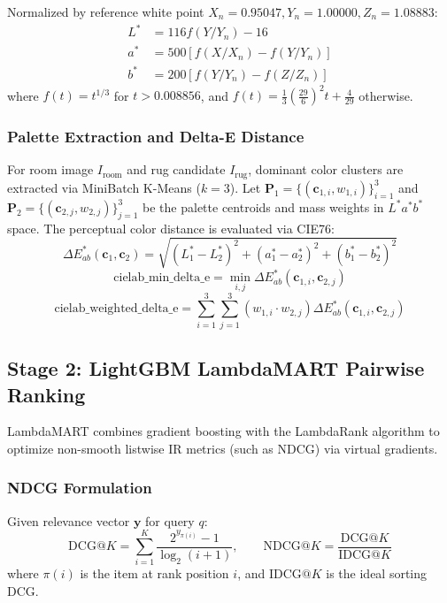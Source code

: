 \documentclass[11pt,a4paper]{article}
\begin{document}
Normalized by reference white point $X_n = 0.95047, Y_n = 1.00000, Z_n = 1.08883$:
\begin{align}
L^* &= 116 f(Y/Y_n) - 16 \\
a^* &= 500 [f(X/X_n) - f(Y/Y_n)] \\
b^* &= 200 [f(Y/Y_n) - f(Z/Z_n)]
\end{align}
where $f(t) = t^{1/3}$ for $t > 0.008856$, and $f(t) = \frac{1}{3} \left(\frac{29}{6}\right)^2 t + \frac{4}{29}$ otherwise.

\subsubsection{Palette Extraction and Delta-E Distance}
For room image $I_{\text{room}}$ and rug candidate $I_{\text{rug}}$, dominant color clusters are extracted via MiniBatch K-Means ($k=3$). Let $\mathbf{P}_1 = \{(\mathbf{c}_{1,i}, w_{1,i})\}_{i=1}^3$ and $\mathbf{P}_2 = \{(\mathbf{c}_{2,j}, w_{2,j})\}_{j=1}^3$ be the palette centroids and mass weights in $L^*a^*b^*$ space. The perceptual color distance is evaluated via CIE76:
\begin{equation}
\Delta E^*_{ab}(\mathbf{c}_1, \mathbf{c}_2) = \sqrt{(L_1^* - L_2^*)^2 + (a_1^* - a_2^*)^2 + (b_1^* - b_2^*)^2}
\end{equation}
\begin{equation}
\text{cielab\_min\_delta\_e} = \min_{i, j} \Delta E^*_{ab}(\mathbf{c}_{1,i}, \mathbf{c}_{2,j})
\end{equation}
\begin{equation}
\text{cielab\_weighted\_delta\_e} = \sum_{i=1}^3 \sum_{j=1}^3 (w_{1,i} \cdot w_{2,j}) \Delta E^*_{ab}(\mathbf{c}_{1,i}, \mathbf{c}_{2,j})
\end{equation}

\subsection{Stage 2: LightGBM LambdaMART Pairwise Ranking}
LambdaMART combines gradient boosting with the LambdaRank algorithm to optimize non-smooth listwise IR metrics (such as NDCG) via virtual gradients.

\subsubsection{NDCG Formulation}
Given relevance vector $\mathbf{y}$ for query $q$:
\begin{equation}
\text{DCG}@K = \sum_{i=1}^K \frac{2^{y_{\pi(i)}} - 1}{\log_2(i + 1)}, \qquad \text{NDCG}@K = \frac{\text{DCG}@K}{\text{IDCG}@K}
\end{equation}
where $\pi(i)$ is the item at rank position $i$, and $\text{IDCG}@K$ is the ideal sorting DCG.
\end{document}
